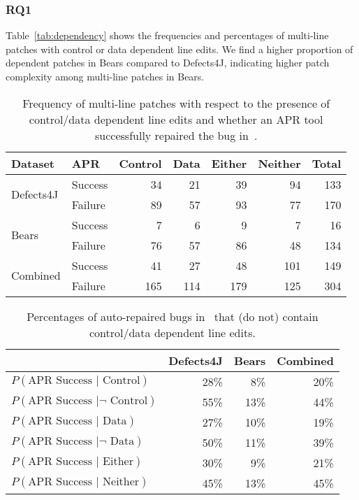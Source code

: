 \documentclass[sigconf, timestamp-false, anonymous=true]{acmart}
\begin{document}
\subsubsection{RQ1} Table~\ref{tab:dependency} shows the 
frequencies and percentages of multi-line patches with control or data dependent 
line edits. We find a higher proportion of dependent patches in Bears compared to 
Defects4J, indicating higher patch complexity among multi-line patches in Bears.


\begin{table}
{\begin{center}
	\begin{tabular}{l | l | r r r r | r}
		\toprule
		Dataset & APR & Control & Data & Either & Neither & Total \\
		\midrule
		\multirow{2}{*}{Defects4J} & Success & 34 & 21 & 39 & 94 & 133 \\
		                                          & Failure   &  89 & 57 & 93 & 77 & 170 \\
		\multirow{2}{*}{Bears}       & Success &    7 &   6 &   9 &   7 &   16 \\
		                                          & Failure   &  76 & 57 & 86 & 48 & 134 \\
		\midrule
		\multirow{2}{*}{Combined}& Success &  41 & 27 & 48 &101& 149 \\
		                                          & Failure   &165 &114&179&125& 304 \\
	\end{tabular}
 \end{center}
}
	\caption{Frequency of multi-line patches with respect to the presence of 
	control/data dependent line edits and whether an APR tool successfully 
	repaired the bug in~\cite{durieux-repair-them-all}.}
	\label{tab:dependency-repair-contingency-table}
\end{table}

\begin{table}
{\begin{center}
	\begin{tabular}{l | rrr}
            	\toprule
		& Defects4J & Bears & Combined \\
		\midrule
		$P(\mbox{APR Success } | \mbox{ Control})$ & 28\% &  8\% & 20\% \\
		$P(\mbox{APR Success } | \neg \mbox{ Control})$ & 55\% & 13\% & 44\% \\
		$P(\mbox{APR Success } | \mbox{ Data})$ & 27\% & 10\% & 19\%\\
		$P(\mbox{APR Success } | \neg \mbox{ Data})$ & 50\% & 11\% & 39\% \\
		$P(\mbox{APR Success } | \mbox{ Either})$ & 30\% & 9\% & 21\% \\
		$P(\mbox{APR Success } | \mbox{ Neither})$ & 45\% & 13\% & 45\% \\
		\bottomrule
	\end{tabular}
 \end{center}
}
	\caption{Percentages of auto-repaired bugs in~\cite{durieux-repair-them-all} 
	that (do not) contain control/data dependent line edits.}
	\label{tab:dependency-repair-percents}
\end{table}
\end{document}

